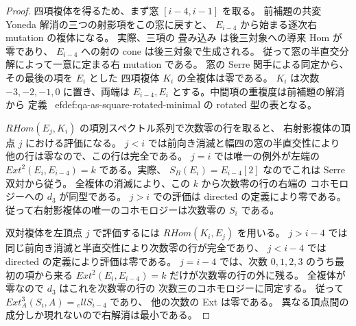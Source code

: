\begin{proof}
四項複体を得るため、まず窓 $[i-4,i-1]$ を取る。
前補題の共変 Yoneda 解消の三つの射影項をこの窓に戻すと、
$E_{i-4}$ から始まる逐次右 mutation の複体になる。
実際、三項の 畳み込み は後三対象への導来 Hom が零であり、
$E_{i-4}$ への射の cone は後三対象で生成される。
従って窓の半直交分解によって一意に定まる右 mutation である。
窓の Serre 関手による同定から、その最後の項を $E_i$ とした
四項複体 $K_i$ の全複体は零である。
$K_i$ は次数 $-3,-2,-1,0$ に置き、両端は
$E_{i-4},E_i$ とする。中間項の重複度は前補題の解消から
定義~
ef{def:qa-as-square-rotated-minimal} の rotated 型の表となる。

$RHom(E_j,K_i)$ の項別スペクトル系列で次数零の行を取ると、
右射影複体の頂点 $j$ における評価になる。
$j<i$ では前向き消滅と幅四の窓の半直交性により
他の行は零なので、この行は完全である。
$j=i$ では唯一の例外が左端の
$Ext^2(E_i,E_{i-4})=k$ である。実際、
$S_B(E_i)=E_{i-4}[2]$ なのでこれは Serre 双対から従う。
全複体の消滅により、この $k$ から次数零の行の右端の
コホモロジーへの $d_3$ が同型である。
$j>i$ での評価は directed の定義により零である。
従って右射影複体の唯一のコホモロジーは次数零の $S_i$ である。

双対複体を左頂点 $j$ で評価するには $RHom(K_i,E_j)$ を用いる。
$j>i-4$ では同じ前向き消滅と半直交性により次数零の行が完全であり、
$j<i-4$ では directed の定義により評価は零である。
$j=i-4$ では、次数 $0,1,2,3$ のうち最初の項から来る
$Ext^2(E_i,E_{i-4})=k$ だけが次数零の行の外に残る。
全複体が零なので $d_3$ はこれを次数零の行の
次数三のコホモロジーに同定する。
従って $Ext^3_A(S_i,A)={}_ell S_{i-4}$ であり、
他の次数の Ext は零である。
異なる頂点間の成分しか現れないので右解消は最小である。
\end{proof}


